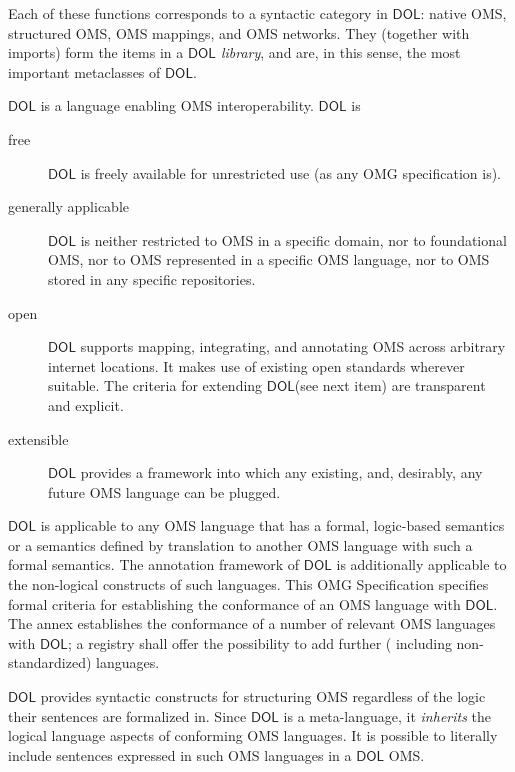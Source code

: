 \documentclass[10pt, a4paper]{isov2}
\newcommand*{\IS}{OMG Specification\xspace}
\newcommand*{\DOL}{\ensuremath{\mathsf{DOL}}\xspace}
\begin{document}
 Each of these functions corresponds to a syntactic category in \DOL: native OMS, structured
 OMS, OMS mappings, and OMS networks. They (together with imports) form the items in a
\emph{\DOL library}, and are, in this sense, the most important metaclasses of \DOL. 


\sclause{Features of \DOL}\label{c:req:overview}

\DOL is a language enabling OMS interoperability. 
\DOL is
\begin{description}
\item[free] \DOL is freely available for unrestricted use (as any OMG specification is).
\item[generally applicable] \DOL is neither restricted to OMS in a specific domain, nor to foundational OMS, nor to OMS represented in a specific OMS language, nor to OMS stored in any specific repositories.
\item[open] \DOL supports mapping, integrating, and annotating OMS across arbitrary internet locations.  It makes use of existing open standards wherever suitable.  The criteria for extending \DOL (see next item) are transparent and explicit.
\item[extensible] \DOL provides a framework into which any existing, and, desirably, any future OMS language can be plugged.
\end{description}
\DOL is applicable to any OMS language that has a formal, logic-based semantics or a semantics defined by translation to another OMS language with such a formal semantics. The annotation framework of \DOL is additionally applicable to the non-logical constructs of such languages. This \IS specifies formal criteria for establishing the conformance of an OMS language with \DOL.  The annex establishes the conformance of a number of relevant OMS languages with \DOL; a registry shall offer the possibility to add further ( including non-standardized) languages. 

\DOL provides syntactic constructs for structuring OMS regardless of the logic their sentences are formalized in. 
Since \DOL is a meta-language,  it \textit{inherits} the logical language aspects of conforming OMS languages.  It is possible to literally include sentences expressed in such OMS languages in a \DOL OMS.
\end{document}
